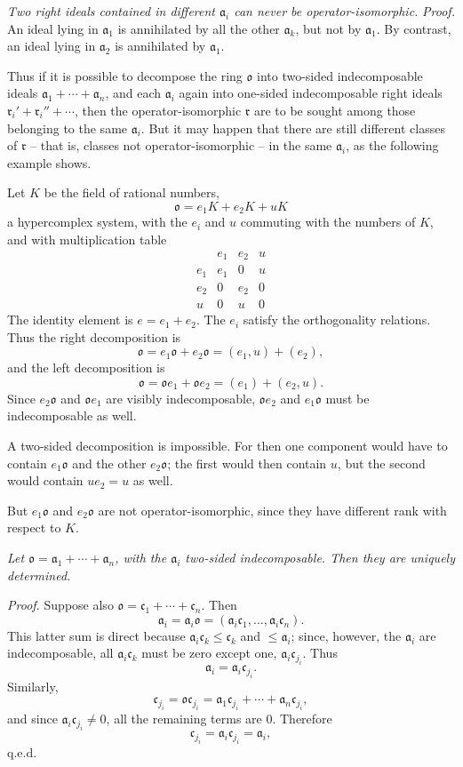 \documentclass[11pt]{article}
\providecommand{\mo}{\mathfrak{o}}
\providecommand{\ma}{\mathfrak{a}}
\providecommand{\mc}{\mathfrak{c}}
\providecommand{\mr}{\mathfrak{r}}
\begin{document}
\emph{Two right ideals contained in different $\ma_i$ can never be operator-isomorphic.}
\emph{Proof.} An ideal lying in $\ma_1$ is annihilated by all the other $\ma_k$, but not by $\ma_1$. By contrast, an ideal lying in $\ma_2$ is annihilated by $\ma_1$.

Thus if it is possible to decompose the ring $\mo$ into two-sided indecomposable ideals $\ma_1+\cdots+\ma_n$, and each $\ma_i$ again into one-sided indecomposable right ideals $\mr_i'+\mr_i''+\cdots$, then the operator-isomorphic $\mr$ are to be sought among those belonging to the same $\ma_i$. But it may happen that there are still different classes of $\mr$ -- that is, classes not operator-isomorphic -- in the same $\ma_i$, as the following example shows.

Let $K$ be the field of rational numbers,
\[
        \mo=e_1K+e_2K+uK
\]
a hypercomplex system, with the $e_i$ and $u$ commuting with the numbers of $K$, and with multiplication table
\[
\begin{array}{c|ccc}
     & e_1&e_2&u\\ \hline
 e_1 & e_1&0&u\\
 e_2 & 0&e_2&0\\
 u   & 0&u&0
\end{array}
\]
The identity element is $e=e_1+e_2$. The $e_i$ satisfy the orthogonality relations. Thus the right decomposition is
\[
        \mo=e_1\mo+e_2\mo=(e_1,u)+(e_2),
\]
and the left decomposition is
\[
        \mo=\mo e_1+\mo e_2=(e_1)+(e_2,u).
\]
Since $e_2\mo$ and $\mo e_1$ are visibly indecomposable, $\mo e_2$ and $e_1\mo$ must be indecomposable as well.

A two-sided decomposition is impossible. For then one component would have to contain $e_1\mo$ and the other $e_2\mo$; the first would then contain $u$, but the second would contain $ue_2=u$ as well.

But $e_1\mo$ and $e_2\mo$ are not operator-isomorphic, since they have different rank with respect to $K$.

\emph{Let $\mo=\ma_1+\cdots+\ma_n$, with the $\ma_i$ two-sided indecomposable. Then they are uniquely determined.}

\emph{Proof.} Suppose also $\mo=\mc_1+\cdots+\mc_n$. Then
\[
        \ma_i=\ma_i\mo=(\ma_i\mc_1,\ldots,\ma_i\mc_n).
\]
This latter sum is direct because $\ma_i\mc_k\leq\mc_k$ and $\leq\ma_i$; since, however, the $\ma_i$ are indecomposable, all $\ma_i\mc_k$ must be zero except one, $\ma_i\mc_{j_i}$. Thus
\[
        \ma_i=\ma_i\mc_{j_i}.
\]
Similarly,
\[
        \mc_{j_i}=\mo\mc_{j_i}=\ma_1\mc_{j_i}+\cdots+\ma_n\mc_{j_i},
\]
and since $\ma_i\mc_{j_i}\ne0$, all the remaining terms are $0$. Therefore
\[
        \mc_{j_i}=\ma_i\mc_{j_i}=\ma_i,
\]
q.e.d.
\end{document}
